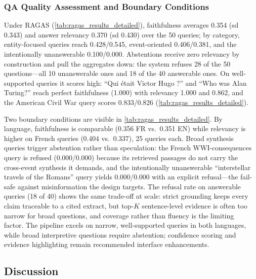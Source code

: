 \documentclass[11pt]{article}
\begin{document}
\subsubsection{QA Quality Assessment and Boundary Conditions}
Under RAGAS (\cref{tab:ragas_results_detailed}), faithfulness averages 0.354 (sd 0.343) and answer relevancy 0.370 (sd 0.430) over the 50 queries; by category, entity-focused queries reach 0.428/0.545, event-oriented 0.406/0.381, and the intentionally unanswerable 0.100/0.000. Abstentions receive zero relevancy by construction and pull the aggregates down: the system refuses 28 of the 50 questions---all 10 unanswerable ones and 18 of the 40 answerable ones. On well-supported queries it scores high: ``{\ttfamily Qui était Victor Hugo ?}'' and ``{\ttfamily Who was Alan Turing?}'' reach perfect faithfulness (1.000) with relevancy 1.000 and 0.862, and the American Civil War query scores 0.833/0.826 (\cref{tab:ragas_results_detailed}). 

Two boundary conditions are visible in \cref{tab:ragas_results_detailed}. By language, faithfulness is comparable (0.356 FR vs.\ 0.351 EN) while relevancy is higher on French queries (0.404 vs.\ 0.337), 25 queries each. Broad synthesis queries trigger abstention rather than speculation: the French WWI-consequences query is refused (0.000/0.000) because its retrieved passages do not carry the cross-event synthesis it demands, and the intentionally unanswerable ``interstellar travels of the Romans'' query yields 0.000/0.000 with an explicit refusal---the fail-safe against misinformation the design targets. The refusal rate on answerable queries (18 of 40) shows the same trade-off at scale: strict grounding keeps every claim traceable to a cited extract, but top-\(K\) sentence-level evidence is often too narrow for broad questions, and coverage rather than fluency is the limiting factor. The pipeline excels on narrow, well-supported queries in both languages, while broad interpretive questions require abstention; confidence scoring and evidence highlighting remain recommended interface enhancements.

\subsection{Discussion}
\label{subsec:discussion}
\end{document}
